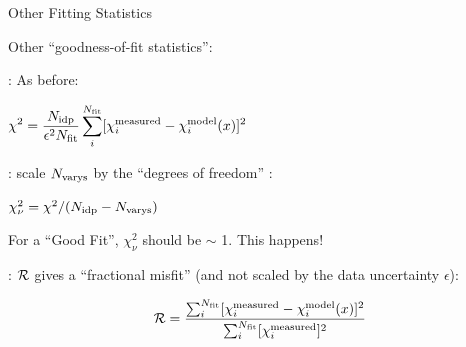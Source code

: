 \begin{slide}{Other Fitting Statistics}

  \begin{cenpage}{135mm}
  Other ``goodness-of-fit statistics'':
  \vmm

  {}: As before:

  \begin{postitbox}{54mm}  $ \displaystyle
    \chi^2  =  \frac{ N_{\rm idp}}{\epsilon^2 N_{\rm fit}}
    \sum_i^{N_{\rm fit}} [\chi_i^{\rm measured} - \chi_i^{\rm model}({x})]^2
    $
  \end{postitbox}

 \vmm
  {}: scale $N_{\rm varys}$ by the ``degrees of freedom'' :

  \begin{postitbox}{38mm}
    $ \chi^2_\nu =  \chi^2 / (N_{\rm idp}-N_{\rm varys}) $
  \end{postitbox}


  For a ``Good Fit'', $\chi^2_\nu$ should be $\sim$ 1.   This
  {} happens!

\vmm

  {}: $\cal{R}$  gives a ``fractional misfit'' (and
  not scaled by the data  uncertainty $\epsilon$):

\vmm

  \begin{postitbox}{50mm}
    \[
{\cal{R}} = \frac{\sum_i^{N_{\rm fit}}[\chi_i^{\rm measured} -
      \chi_i^{\rm model}({x})]^2 }{
      \sum_i^{N_{\rm fit}} [{\chi_i^{\rm measured}}]^2}
    \]
  \end{postitbox}

\vfill
\end{cenpage}
\end{slide}




